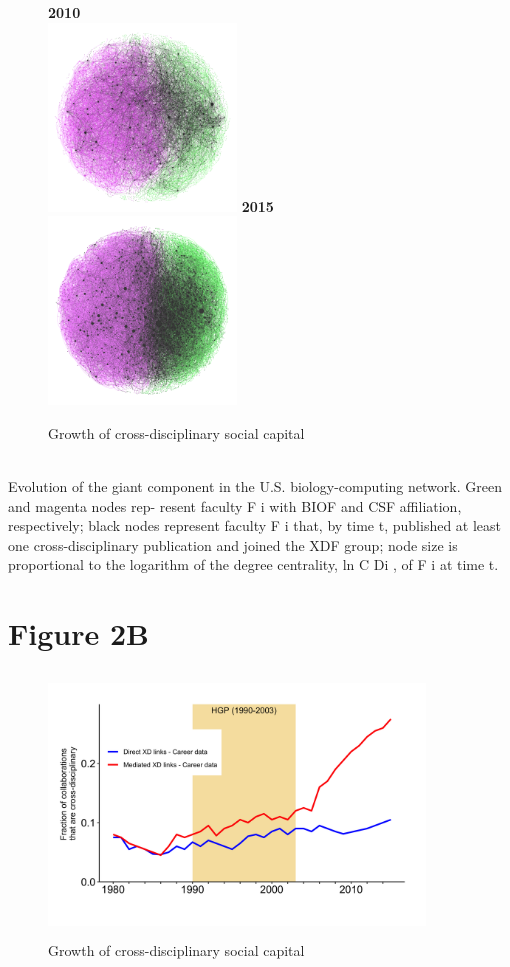 \documentclass[10pt]{article}         %
\begin{document}
\begin{figure}[!htb]
  \endminipage\hfill
    \textbf{2010}\\
    \includegraphics[width=5cm, height=5cm]{Fig2A2010.png}
  \endminipage\hfill
    \textbf{2015}\\
    \includegraphics[width=5cm, height=5cm]{Fig2A2015.png}
  \endminipage
  \caption{Growth of cross-disciplinary social capital}
  \label{fig:2A}
\end{figure}\\
Evolution of the giant component in the U.S. biology-computing network. Green and magenta nodes rep- resent faculty F i with BIOF and CSF affiliation, respectively; black nodes represent faculty F i that, by time t, published at least one cross-disciplinary publication and joined the XDF group; node size is proportional to the logarithm of the degree centrality, ln C Di , of F i at time t.

\newpage
\section{Figure 2B}
\begin{figure}[!htb]
  \centering
  \includegraphics[width=10cm, height=7cm]{Fig2B.png}
  \caption{Growth of cross-disciplinary social capital}
  \label{fig:2B}
\end{figure}
\end{document}
